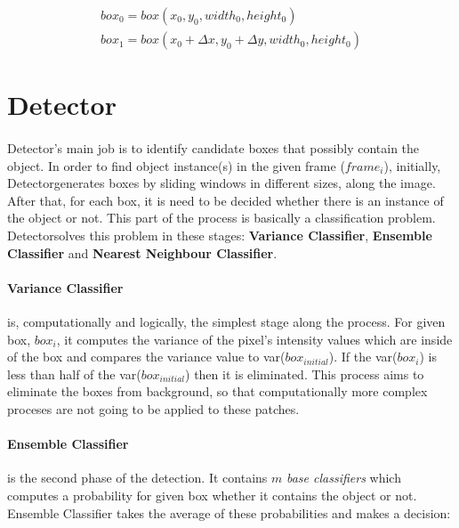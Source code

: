 \documentclass{report}
\newcommand{\Detector}{Detector}
\newcommand{\initialbox}{$ box_{initial} $}
\begin{document}
            \begin{gather}
                box_{0} = box(x_{0}, y_{0}, width_{0}, height_{0}) \\
                box_{1} = box(x_{0} + \Delta x, y_{0} + \Delta y, width_{0}, height_{0})
            \end{gather}
    \section{Detector}
        \paragraph{}
            \Detector's main job is to identify candidate boxes that possibly contain the object. In order to find
            object instance(s) in the given frame ($frame_{i}$), initially, \Detector generates boxes by sliding windows in different sizes,
            along the image. After that, for each box, it is need to be decided whether there is an instance of the object or not.
            This part of the process is basically a classification problem. \Detector solves this problem in these stages:
            \textbf{Variance Classifier}, \textbf{Ensemble Classifier} and \textbf{Nearest Neighbour Classifier}.

        \paragraph{Variance Classifier}
            is, computationally and logically, the simplest stage along the process.
            For given box, $box_{i}$, it computes the variance of the pixel's intensity values which are inside of the box and
            compares the variance value to var(\initialbox). If the var($box_{i}$) is less than half of the
            var(\initialbox) then it is eliminated. This process aims to eliminate the boxes from background, so that
            computationally more complex proceses are not going to be applied to these patches.

        \paragraph{Ensemble Classifier}
            is the second phase of the detection. It contains $m$ \textit{base classifiers} which computes a probability for given
            box whether it contains the object or not. Ensemble Classifier takes the average of these probabilities and
            makes a decision:
\end{document}

